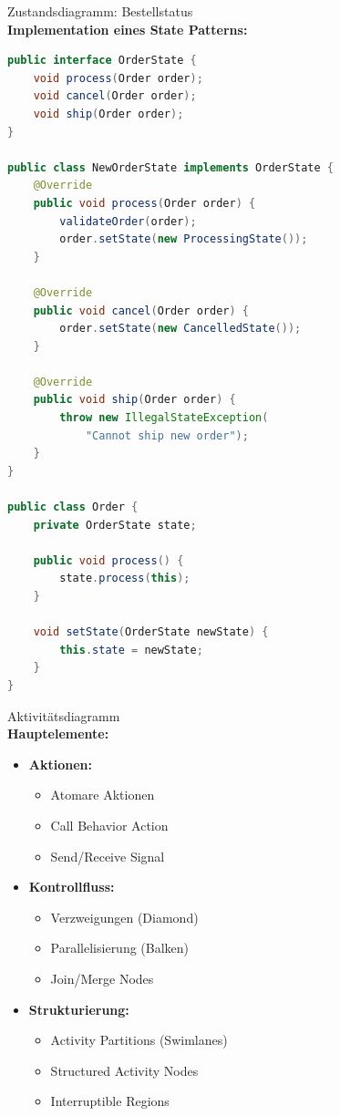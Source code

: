 \begin{example2}{Zustandsdiagramm: Bestellstatus}\\
\textbf{Implementation eines State Patterns:}

\begin{lstlisting}[language=Java, style=basesmol]
public interface OrderState {
    void process(Order order);
    void cancel(Order order);
    void ship(Order order);
}

public class NewOrderState implements OrderState {
    @Override
    public void process(Order order) {
        validateOrder(order);
        order.setState(new ProcessingState());
    }
    
    @Override
    public void cancel(Order order) {
        order.setState(new CancelledState());
    }
    
    @Override
    public void ship(Order order) {
        throw new IllegalStateException(
            "Cannot ship new order");
    }
}

public class Order {
    private OrderState state;
    
    public void process() {
        state.process(this);
    }
    
    void setState(OrderState newState) {
        this.state = newState;
    }
}
\end{lstlisting}
\end{example2}

\begin{definition}{Aktivitätsdiagramm}\\
\textbf{Hauptelemente:}
\begin{itemize}
    \item \textbf{Aktionen:}
    \begin{itemize}
        \item Atomare Aktionen
        \item Call Behavior Action
        \item Send/Receive Signal
    \end{itemize}
    
    \item \textbf{Kontrollfluss:}
    \begin{itemize}
        \item Verzweigungen (Diamond)
        \item Parallelisierung (Balken)
        \item Join/Merge Nodes
    \end{itemize}
    
    \item \textbf{Strukturierung:}
    \begin{itemize}
        \item Activity Partitions (Swimlanes)
        \item Structured Activity Nodes
        \item Interruptible Regions
    \end{itemize}
\end{itemize}
\end{definition}

